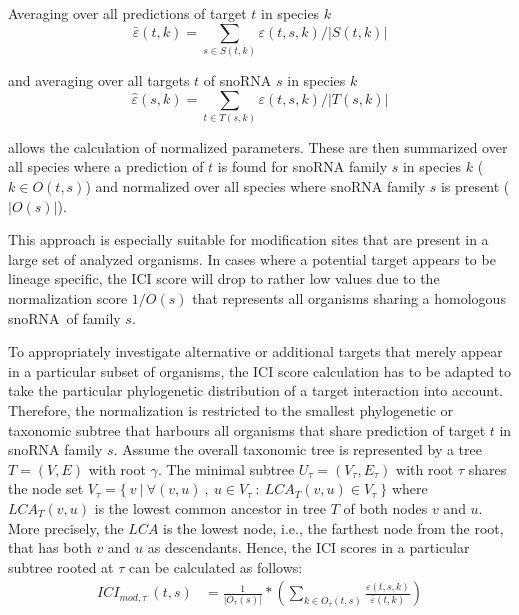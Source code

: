 \documentclass[preprint,3p,times,twocolumn]{elsarticle}
\newcommand{\sno}{snoRNA}
\begin{document}
Averaging over all predictions of target $t$ in
species $k$
\begin{equation}
\bar\varepsilon(t,k)=\sum_{s\in
  S(t,k)}\varepsilon(t,s,k)/|S(t,k)|
\end{equation}

and averaging over all targets $t$ of snoRNA $s$ in species $k$
\begin{equation}
\hat\varepsilon(s,k)=\sum_{t\in
  T(s,k)}\varepsilon(t,s,k)/|T(s,k)|
\end{equation}

allows the calculation of normalized
parameters. These are then summarized over all species where a prediction of $t$ is found for snoRNA family $s$ in species $k$ ($k\in O(t,s) $) and normalized over all species where snoRNA family $s$ is present ($|O(s)|$).


This approach is especially suitable for modification
sites that are present in a large set of analyzed organisms. In cases
where a potential target appears to be lineage specific, the ICI score
will drop to rather low values due to the normalization score $1/O(s)$
that represents all organisms sharing a homologous \sno\ of family
$s$.

To appropriately investigate alternative or additional targets that
merely appear in a particular subset of organisms, the ICI score
calculation has to be adapted to take the particular phylogenetic
distribution of a target interaction into account. Therefore, the
normalization is restricted to the smallest phylogenetic or taxonomic subtree that
harbours all organisms that share prediction of target $t$ in snoRNA family $s$.
Assume the overall  taxonomic tree is
represented by a tree $T=(V,E)$ with root $\gamma$. The minimal subtree
$U_\tau = (V_\tau, E_\tau)$ with root $\tau$ shares the node set
$V_\tau = \{\  v\  |\  \forall (v,u)\ ,\  u \in V_\tau\  :\
LCA_T(v,u) \in V_\tau\  \}$ where $LCA_T(v,u)$ is the lowest common ancestor in tree $T$
of both nodes $v$ and $u$. More precisely, the $LCA$ is the lowest node,
i.e., the farthest node from the root, that has both $v$ and $u$ as
descendants.
Hence, the ICI scores in a particular subtree rooted at $\tau$ can be
calculated as follows:
\begin{equation}
  \begin{split}
    ICI_{mod,\tau}\:(t,s) & = \frac{1}{|O_\tau(s)|} * \left( \sum_{k\in O_\tau(t,s)} \frac{\varepsilon(t,s,k)}{\bar\varepsilon(t,k)} \right)
  \end{split}
\end{equation}
\end{document}
